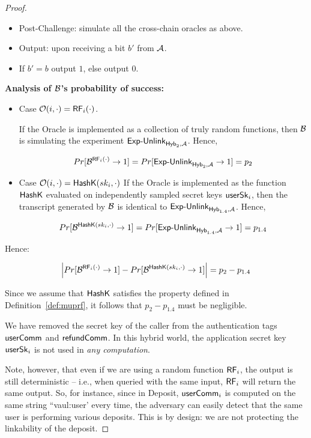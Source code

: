 \begin{proof}
\begin{tcolorbox}
\begin{itemize}
\item Post-Challenge: simulate all the cross-chain oracles as above.
\item Output: upon receiving a bit $b'$ from $\mathcal{A}$.
\item If $b'=b$ output $1$, else output $0$.
\end{itemize}
\end{tcolorbox}


\vspace{5pt}
\noindent
\textbf{Analysis of $\mathcal{B}$'s probability of success:}
\begin{itemize}
    \item Case $\mathcal{O}(i,\cdot)= \mathsf{RF}_i(\cdot)$.

    If the Oracle is implemented as a collection of truly random functions, then  $\mathcal{B}$ is simulating the experiment $\mathsf{Exp\text{-}Unlink}_{\mathsf{Hyb}_{2},\mathcal{A}}$.
    Hence,


$$Pr[\mathcal{B}^{\mathsf{RF}_i(\cdot)}\rightarrow 1 ] = Pr[\mathsf{Exp\text{-}Unlink}_{\mathsf{Hyb}_{2},\mathcal{A}}\rightarrow 1 ]= p_{2}$$


     \item Case $\mathcal{O}(i,\cdot)= \mathsf{HashK}(sk_i,\cdot)$
      If the Oracle is implemented as the function $\mathsf{HashK}$ evaluated on  independently sampled secret keys $\mathsf{userSk}_i$, then the transcript generated by $\mathcal{B}$ is identical to $\mathsf{Exp\text{-}Unlink}_{\mathsf{Hyb}_{1.4},\mathcal{A}}$. Hence,


     $$Pr[\mathcal{B}^{\mathsf{HashK}(sk_i, \cdot)}\rightarrow 1] = Pr[\mathsf{Exp\text{-}Unlink}_{\mathsf{Hyb}_{1.4},\mathcal{A}}\rightarrow 1 ]= p_{1.4}$$

\end{itemize}


Hence:

$$ \left| Pr[\mathcal{B}^{\mathsf{RF}_i(\cdot)}\rightarrow 1] - Pr[\mathcal{B}^{\mathsf{HashK}(sk_i, \cdot)}\rightarrow 1] \right|  = p_{2}- p_{1.4}  $$

Since we assume that $\mathsf{HashK}$ satisfies the property defined in Definition~\ref{def:muprf}, it follows that $p_{2}- p_{1.4}$ must  be negligible.


\vspace{10pt}
We have removed the secret key of the caller from the authentication tags $\mathsf{userComm}$ and $\mathsf{refundComm}$.
In this hybrid world, the application secret key  $\mathsf{userSk}_i$ is not used in \emph{any computation}.


Note, however, that even  if we are using a random function $\mathsf{RF}_i$, the output  is still deterministic -- i.e., when queried with the same input, $\mathsf{RF}_i$ will return the same output.
So, for instance, since in Deposit,  $\mathsf{userComm}_i$ is computed on the same string ``vaul:user' every time, the adversary can easily detect that the same user is performing various deposits. This is by design: we are not protecting the linkability of the deposit.


\end{proof}

